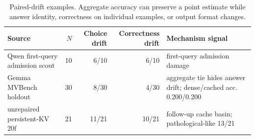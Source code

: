 \begin{table}[H]
\centering
\caption{Paired-drift examples. Aggregate accuracy can preserve a point estimate while answer identity, correctness on individual examples, or output format changes.}
\label{tab:paired-drift}
\small
\renewcommand{\arraystretch}{\PaperTableStretch}
\begin{tabularx}{\linewidth}{@{}Y r r r Y@{}}
\toprule
Source & \(N\) & Choice drift & Correctness drift & Mechanism signal \\
\midrule
Qwen first-query admission scout & 10 & 6/10 & 6/10 & first-query admission damage \\
Gemma MVBench holdout & 30 & 8/30 & 4/30 & aggregate tie hides answer drift; dense/cached acc. 0.200/0.200 \\
unrepaired persistent-KV 20f & 21 & 11/21 & 10/21 & follow-up cache basin; pathological-like 13/21 \\
\bottomrule
\end{tabularx}
\end{table}

